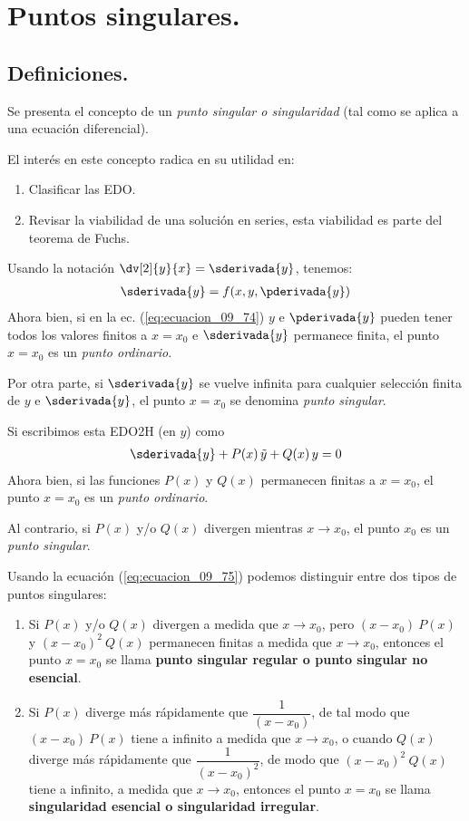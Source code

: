 \section{Puntos singulares.}
\subsection{Definiciones.}

Se presenta el concepto de un \emph{punto singular o singularidad} (tal como se aplica a una ecuación diferencial).
\par
El interés en este concepto radica en su utilidad en:
\begin{enumerate}
\item Clasificar las EDO.
\item Revisar la viabilidad de una solución en series, esta viabilidad es parte del teorema de Fuchs.
\end{enumerate}
Usando la notación $\displaystyle \dv[2]{y}{x} = \sderivada{y}$, tenemos:
\begin{align}
\sderivada{y} = f(x, y, \pderivada{y})
\label{eq:ecuacion_09_74}
\end{align}
Ahora bien, si en la ec. (\ref{eq:ecuacion_09_74}) $y$ e $\pderivada{y}$ pueden tener todos los valores finitos a $x = x_{0}$ e $\sderivada{y}$ permanece finita, el punto $x = x_{0}$ es un \emph{punto ordinario}.
\par
Por otra parte, si $\sderivada{y}$ se vuelve infinita para cualquier selección finita de $y$ e  $\sderivada{y}$, el punto $x = x_{0}$ se denomina \emph{punto singular}.
\par
Si escribimos esta EDO2H (en $y$) como
\begin{align}
\sderivada{y} + P(x) \, \tilde{y} + Q(x) \, y = 0
\label{eq:ecuacion_09_75}
\end{align}
Ahora bien, si las funciones $P(x)$ y $Q(x)$ permanecen finitas a $x = x_{0}$, el punto $x = x_{0}$ es un \emph{punto ordinario}.
\par
Al contrario, si $P(x)$ y/o $Q(x)$ divergen mientras $x \to x_{0}$, el punto $x_{0}$ es un \emph{punto singular}.
\par
Usando la ecuación (\ref{eq:ecuacion_09_75}) podemos distinguir entre dos tipos de puntos singulares:
\begin{enumerate}
\item Si $P(x)$ y/o $Q(x)$ divergen a medida que $x \to x_{0}$, pero $(x - x_{0}) \: P(x)$ y $(x - x_{0})^{2} \: Q(x)$ permanecen finitas a medida que $x \to x_{0}$, entonces el punto $x = x_{0}$ se llama \textbf{punto singular regular o punto singular no esencial}.
\item Si $P(x)$ diverge más rápidamente que $\dfrac{1}{(x - x_{0})}$, de tal modo que $(x - x_{0}) \: P(x)$ tiene a infinito a medida que $x \to x_{0}$, o cuando $Q(x)$ diverge más rápidamente que $\dfrac{1}{(x - x_{0})^{2}}$, de modo que $(x - x_{0})^{2} \: Q(x)$ tiene a infinito, a medida que $x \to x_{0}$, entonces el punto $x = x_{0}$ se llama \textbf{singularidad esencial o singularidad irregular}.
\end{enumerate}
